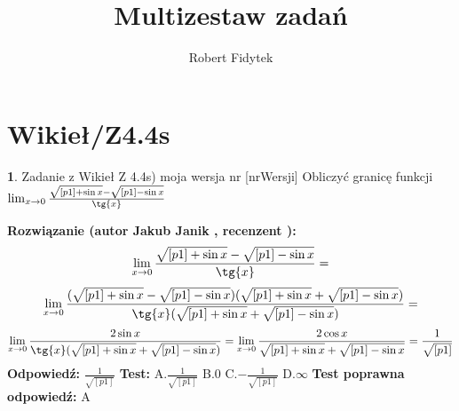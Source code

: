 \documentclass[12pt, a4paper]{article}
\title{Multizestaw zadań}
\author{Robert Fidytek}
\date{}
\theoremstyle{definition} %
\newtheorem{zad}{}
\newcommand{\kategoria}[1]{\section{#1}} %
\newcommand{\zadStart}[1]{\begin{zad}#1\newline} %
\newcommand{\zadStop}{\end{zad}}   %
\newcommand{\rozwStart}[2]{\noindent \textbf{Rozwiązanie (autor #1 , recenzent #2): }\newline} %
\newcommand{\rozwStop}{\newline}                                            %
\newcommand{\odpStart}{\noindent \textbf{Odpowiedź:}\newline}    %
\newcommand{\odpStop}{\newline}                                             %
\newcommand{\testStart}{\noindent \textbf{Test:}\newline} %
\newcommand{\testStop}{\newline} %
\newcommand{\kluczStart}{\noindent \textbf{Test poprawna odpowiedź:}\newline} %
\newcommand{\kluczStop}{\newline} %
\begin{document}
\maketitle


\kategoria{Wikieł/Z4.4s}
\zadStart{Zadanie z Wikieł Z 4.4s) moja wersja nr [nrWersji]}
Obliczyć granicę funkcji $\lim_{x \to 0} \frac{\sqrt{[p1]+\sin{x}}-\sqrt{[p1]-\sin{x}}}{\tg{x}}$
\zadStop
\rozwStart{Jakub Janik}{}
$$\lim_{x \to 0} \frac{\sqrt{[p1]+\sin{x}}-\sqrt{[p1]-\sin{x}}}{\tg{x}}=$$
$$\lim_{x \to 0} \frac{(\sqrt{[p1]+\sin{x}}-\sqrt{[p1]-\sin{x}})(\sqrt{[p1]+\sin{x}}+\sqrt{[p1]-\sin{x}})}{\tg{x}(\sqrt{[p1]+\sin{x}}+\sqrt{[p1]-\sin{x}})}=$$
$$\lim_{x \to 0} \frac{2\sin{x}}{\tg{x}(\sqrt{[p1]+\sin{x}}+\sqrt{[p1]-\sin{x}})}=\lim_{x \to 0} \frac{2\cos{x}}{\sqrt{[p1]+\sin{x}}+\sqrt{[p1]-\sin{x}}}=\frac{1}{\sqrt{[p1]}}$$
\rozwStop
\odpStart
$\frac{1}{\sqrt{[p1]}}$
\odpStop
\testStart
A.$\frac{1}{\sqrt{[p1]}}$
B.$0$
C.$-\frac{1}{\sqrt{[p1]}}$
D.$\infty$
\testStop
\kluczStart
A
\kluczStop
\end{document}
